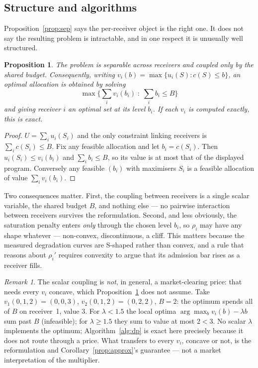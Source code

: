 \documentclass[sigconf,anonymous]{aamas}
\newtheorem{proposition}{Proposition}
\theoremstyle{remark}
\newtheorem{remark}{Remark}
\begin{document}
\subsection{Structure and algorithms}
\label{sec:alg}

Proposition~\ref{prop:sep} says the per-receiver object is the right
one. It does not say the resulting problem is intractable, and in one
respect it is unusually well structured.

\begin{proposition}
\label{prop:decomp}
The problem is separable across receivers and coupled only by the
shared budget. Consequently, writing
$v_i(b) = \max\{u_i(S) : c(S) \le b\}$, an optimal allocation is
obtained by solving
\[
\max\Big\{ \textstyle\sum_i v_i(b_i) \;:\; \sum_i b_i \le B \Big\}
\]
and giving receiver $i$ an optimal set at its level $b_i$. If each
$v_i$ is computed exactly, this is exact.
\end{proposition}

\begin{proof}
$U = \sum_i u_i(S_i)$ and the only constraint linking receivers is
$\sum_i c(S_i) \le B$. Fix any feasible allocation and let
$b_i = c(S_i)$. Then $u_i(S_i) \le v_i(b_i)$ and $\sum_i b_i \le B$, so
its value is at most that of the displayed program. Conversely any
feasible $(b_i)$ with maximisers $S_i$ is a feasible allocation of
value $\sum_i v_i(b_i)$.
\end{proof}

Two consequences matter. First, the coupling between receivers is a
single scalar variable, the shared budget $B$, and nothing else --- no
pairwise interaction between receivers survives the reformulation.
Second, and less obviously, the saturation penalty enters \emph{only}
through the chosen level $b_i$, so $\rho_i$ may have any shape
whatever --- non-convex, discontinuous, a cliff. This matters because
the measured degradation curves are S-shaped rather than convex, and a
rule that reasons about $\rho_i'$ requires convexity to argue that its
admission bar rises as a receiver fills.

\begin{remark}
\label{rem:noprice}
The scalar coupling is \emph{not}, in general, a market-clearing
price: that needs every $v_i$ concave, which Proposition~\ref{prop:decomp}
does not assume. Take $v_1(0,1,2)=(0,0,3)$, $v_2(0,1,2)=(0,2,2)$,
$B=2$: the optimum spends all of $B$ on receiver~1, value $3$. For
$\lambda<1.5$ the local optima $\arg\max_b v_i(b)-\lambda b$ sum past
$B$ (infeasible); for $\lambda\ge1.5$ they sum to value at most
$2<3$. No scalar $\lambda$ implements the optimum;
Algorithm~\ref{alg:dp} is exact here precisely because it does not
route through a price. What transfers to every $v_i$, concave or not,
is the reformulation and Corollary~\ref{prop:approx}'s guarantee ---
not a market interpretation of the multiplier.
\end{remark}
\end{document}
